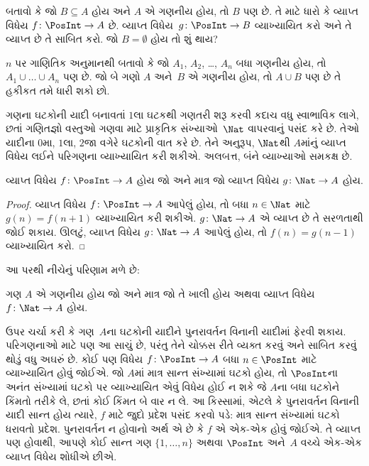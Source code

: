 \begin{prob}
બતાવો કે જો $B \subseteq A$ હોય અને $A$ એ
ગણનીય હોય, તો $B$ પણ છે. તે માટે ધારો કે
વ્યાપ્ત વિધેય $f\colon \PosInt \to
A$ છે. વ્યાપ્ત વિધેય~$g\colon \PosInt \to B$
વ્યાખ્યાયિત કરો અને તે વ્યાપ્ત છે તે સાબિત કરો.
જો $B = \emptyset$ હોય તો શું થાય?
\end{prob}

\begin{prob}
$n$ પર ગાણિતિક અનુમાનથી બતાવો કે જો $A_1$, $A_2$,
\dots, $A_n$ બધા ગણનીય હોય, તો
$A_1 \cup \dots \cup A_n$ પણ છે.
જો બે ગણો $A$ અને~$B$ એ ગણનીય હોય,
તો $A \cup
B$ પણ છે તે હકીકત તમે ધારી શકો છો.
\end{prob}

ગણના ઘટકોની યાદી બનાવતાં $1$લા ઘટકથી
ગણતરી શરૂ કરવી કદાચ વધુ સ્વાભાવિક લાગે, છતાં ગણિતજ્ઞો
વસ્તુઓ ગણવા માટે પ્રાકૃતિક સંખ્યાઓ~$\Nat$ વાપરવાનું
પસંદ કરે છે. તેઓ યાદીના $0$મા, $1$લા, $2$જા વગેરે
ઘટકોની વાત કરે છે. તેને અનુરૂપ,
$\Nat$થી $A$માંનું વ્યાપ્ત વિધેય લઈને
પરિગણના વ્યાખ્યાયિત કરી શકીએ. અલબત્ત, બંને વ્યાખ્યાઓ
સમકક્ષ છે.

\begin{prop}
વ્યાપ્ત વિધેય $f\colon \PosInt \to A$ હોય
જો અને માત્ર જો વ્યાપ્ત વિધેય $g\colon \Nat \to A$ હોય.
\end{prop}

\begin{proof}
વ્યાપ્ત વિધેય $f\colon \PosInt \to A$ આપેલું હોય,
તો બધા $n \in \Nat$ માટે $g(n) =
f(n+1)$ વ્યાખ્યાયિત કરી શકીએ.
$g\colon \Nat
\to A$ એ વ્યાપ્ત છે તે સરળતાથી જોઈ શકાય.
ઊલટું, વ્યાપ્ત વિધેય $g\colon
\Nat \to A$ આપેલું હોય, તો $f(n) = g(n-1)$ વ્યાખ્યાયિત કરો.
\end{proof}

આ પરથી નીચેનું પરિણામ મળે છે:

\begin{cor}
ગણ $A$ એ ગણનીય હોય જો અને માત્ર જો
તે ખાલી હોય અથવા વ્યાપ્ત વિધેય
$f\colon \Nat \to A$ હોય.
\end{cor}

ઉપર ચર્ચા કરી કે ગણ~$A$ના ઘટકોની યાદીને
પુનરાવર્તન વિનાની યાદીમાં ફેરવી શકાય. પરિગણનાઓ માટે
પણ આ સાચું છે, પરંતુ તેને ચોક્કસ રીતે વ્યક્ત કરવું
અને સાબિત કરવું થોડું વધુ અઘરું છે. કોઈ પણ વિધેય
$f\colon \PosInt \to A$ બધા $n \in
\PosInt$ માટે વ્યાખ્યાયિત હોવું જોઈએ. જો $A$માં
માત્ર સાન્ત સંખ્યામાં ઘટકો હોય, તો
$\PosInt$ના અનંત સંખ્યામાં ઘટકો પર
વ્યાખ્યાયિત એવું વિધેય હોઈ ન શકે જે $A$ના બધા
ઘટકોને કિંમતો તરીકે લે, છતાં કોઈ કિંમત
બે વાર ન લે. આ કિસ્સામાં, એટલે કે પુનરાવર્તન
વિનાની યાદી સાન્ત હોય ત્યારે, $f$ માટે જુદો પ્રદેશ
પસંદ કરવો પડે: માત્ર સાન્ત સંખ્યામાં ઘટકો
ધરાવતો પ્રદેશ. પુનરાવર્તન ન હોવાનો અર્થ એ છે
કે $f$ એ એક-એક હોવું જોઈએ. તે
વ્યાપ્ત પણ હોવાથી, આપણે કોઈ સાન્ત ગણ
$\{1, \dots, n\}$ અથવા $\PosInt$ અને~$A$
વચ્ચે એક-એક વ્યાપ્ત વિધેય શોધીએ છીએ.

